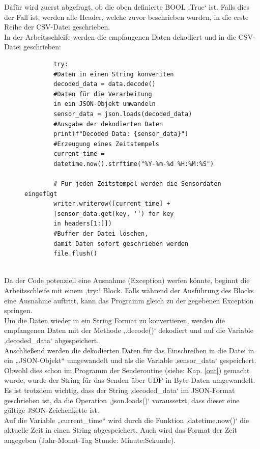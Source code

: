 Dafür wird zuerst abgefragt, ob die oben definierte BOOL ‚True‘ ist. Falls dies der Fall ist, werden alle Header, welche zuvor beschrieben wurden, in die erste Reihe der CSV-Datei geschrieben.\\
\newpage
In der Arbeitsschleife werden die empfangenen Daten dekodiert und in die CSV-Datei geschrieben: 
\vspace{3mm} 
\begin{figure}[H]
	\centering
	\begin{verbatim}
		try:
		#Daten in einen String konveriten
		decoded_data = data.decode()
		#Daten für die Verarbeitung 
		in ein JSON-Objekt umwandeln
		sensor_data = json.loads(decoded_data)
		#Ausgabe der dekodierten Daten
		print(f"Decoded Data: {sensor_data}")
		#Erzeugung eines Zeitstempels 
		current_time = 
		datetime.now().strftime("%Y-%m-%d %H:%M:%S")
		
		# Für jeden Zeitstempel werden die Sensordaten eingefügt
		writer.writerow([current_time] +
		[sensor_data.get(key, '') for key
		in headers[1:]])
		#Buffer der Datei löschen, 
		damit Daten sofort geschrieben werden
		file.flush()
		
	\end{verbatim}
\end{figure}
Da der Code potenziell eine Ausnahme (Exception) werfen könnte, beginnt die Arbeitsschleife mit einem ‚try:‘ Block. Falls während der Ausführung des Blocks eine Ausnahme auftritt, kann das Programm gleich zu der gegebenen Exception springen. \\
\vspace{3mm}
Um die Daten wieder in ein String Format zu konvertieren, werden die empfangenen Daten mit der Methode ‚.decode()‘ dekodiert und auf die Variable ‚decoded\_data‘ abgespeichert. \\
\vspace{3mm}
Anschließend werden die dekodierten Daten für das Einschreiben in die Datei in ein „JSON-Objekt“ umgewandelt und als die Variable ‚sensor\_data‘ gespeichert. Obwohl dies schon im Programm der Senderoutine (siehe: Kap. \ref{out}) gemacht wurde, wurde der String für das Senden über UDP in Byte-Daten umgewandelt. Es ist trotzdem wichtig, dass der String ‚decoded\_data‘ im JSON-Format geschrieben ist, da die Operation ‚json.loads()‘ voraussetzt, dass dieser eine gültige JSON-Zeichenkette ist.\\
\vspace{3mm} 
Auf die Variable „current\_time“ wird durch die Funktion ‚datetime.now()‘ die aktuelle Zeit in einen String abgespeichert. Auch wird das Format der Zeit angegeben (Jahr-Monat-Tag Stunde: Minute:Sekunde).\\
